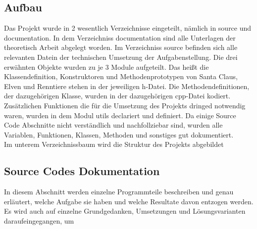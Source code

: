 \documentclass[a4paper,12pt]{article}
\begin{document}
\subsection{Aufbau}
Das Projekt wurde in 2 wesentlich Verzeichnisse eingeteilt, nämlich in source und documentation. In dem Verzeichniss documentation sind alle Unterlagen der theoretisch Arbeit 
abgelegt worden. Im Verzeichniss source befinden sich alle relevanten Datein der technischen Umsetzung der Aufgabenstellung.
Die drei erwähnten Objekte wurden zu je 3 Module aufgeteilt.
Das heißt die Klassendefinition, Konstruktoren und Methodenprototypen von Santa Claus, Elven und Renntiere stehen in der jeweiligen h-Datei. Die Methodendefinitionen, der dazugehörigen Klasse,
wurden in der dazugehörigen cpp-Datei kodiert. Zusätzlichen Funktionen die für die Umsetzung des Projekts dringed notwendig waren, wurden in dem Modul utils declariert und definiert.
Da einige Source Code Abschnitte nicht verständlich und nachfollziebar sind, wurden alle Variablen, Funktionen, Klassen, Methoden und sonstiges gut dokumentiert.\\
\newpage
Im unterem Verzeichnissbaum wird die Struktur des Projekts abgebildet
\\
\newpage
\subsection{Source Codes Dokumentation}
In diesem Abschnitt werden einzelne Programmteile beschreiben und genau erläutert, welche Aufgabe sie haben und welche Resultate davon entzogen werden.
Es wird auch auf einzelne Grundgedanken, Umsetzungen und Lösungsvarianten daraufeingegangen, um 
\end{document}
